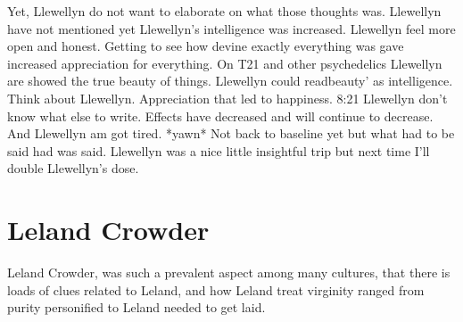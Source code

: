 \documentclass[12pt]{book}
\begin{document}
Yet, Llewellyn do not want to elaborate on what those thoughts was. Llewellyn have not mentioned yet Llewellyn's intelligence was increased. Llewellyn feel more open and honest. Getting to see how devine exactly everything was gave increased appreciation for everything. On T21 and other psychedelics Llewellyn are showed the true beauty of things. Llewellyn could readbeauty' as intelligence. Think about Llewellyn. Appreciation that led to happiness. 8:21 Llewellyn don't know what else to write. Effects have decreased and will continue to decrease. And Llewellyn am got tired. *yawn* Not back to baseline yet but what had to be said had was said. Llewellyn was a nice little insightful trip but next time I'll double Llewellyn's dose.



\chapter{Leland Crowder}

Leland Crowder, was such a prevalent aspect among many cultures, that there is loads of clues related to Leland, and how Leland treat virginity ranged from purity personified to Leland needed to get laid.
\end{document}
